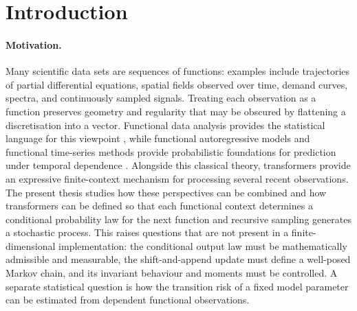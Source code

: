 \section{Introduction}\label{sec:Introduction}

\paragraph{Motivation.}
Many scientific data sets are sequences of functions: examples include trajectories of partial differential equations, spatial fields observed over time, demand curves, spectra, and continuously sampled signals. Treating each observation as a function preserves geometry and regularity that may be obscured by flattening a discretisation into a vector. Functional data analysis provides the statistical language for this viewpoint \cite{RamsaySilverman2005}, while functional autoregressive models and functional time-series methods provide probabilistic foundations for prediction under temporal dependence \cite{Bosq2000,HormannKokoszka2010,AueEtAl2015}. Alongside this classical theory, transformers provide an expressive finite-context mechanism for processing several recent observations. The present thesis studies how these perspectives can be combined and how transformers can be defined so that each functional context determines a conditional probability law for the next function and recursive sampling generates a stochastic process. This raises questions that are not present in a finite-dimensional implementation: the conditional output law must be mathematically admissible and measurable, the shift-and-append update must define a well-posed Markov chain, and its invariant behaviour and moments must be controlled. A separate statistical question is how the transition risk of a fixed model parameter can be estimated from dependent functional observations.

